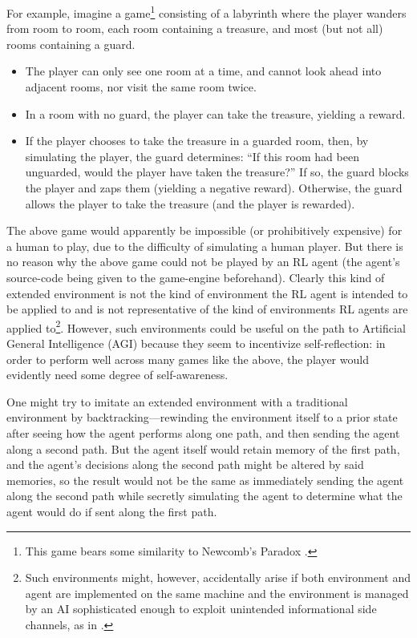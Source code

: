 \documentclass[runningheads]{llncs}
\begin{document}
For example, imagine a game\footnote{This game bears some similarity to Newcomb's
Paradox \cite{nozick1969newcomb}.} consisting of a
labyrinth where the player wanders from
room to room, each room containing a treasure, and most (but not all) rooms containing
a guard.
\begin{itemize}
    \item
    The player can only see one room at a time, and cannot look ahead into adjacent
    rooms, nor visit the same room twice.
    \item
    In a room with no guard, the player can take the treasure, yielding a reward.
    \item
    If the player chooses to take the treasure in a guarded room,
    then, by simulating the player, the guard determines: ``If
    this room had been unguarded, would the player have taken the treasure?''
    If so, the guard blocks the player and zaps them (yielding a negative reward).
    Otherwise, the guard allows the player to take the treasure (and the player is rewarded).
\end{itemize}

The above game would apparently be impossible (or prohibitively expensive)
for a human to play, due to the difficulty of simulating a human player.
But there is no reason why the above game could not be played by an RL agent (the
agent's source-code being given to the game-engine beforehand). Clearly this kind of
extended environment is not the kind of environment the RL agent is intended to be
applied to and is not representative of the kind of environments RL agents are
applied to\footnote{Such environments might, however, accidentally arise if both environment
and agent are implemented on the same machine and the environment is managed by an AI
sophisticated enough to exploit unintended informational side channels, as in
\cite{yampolskiy2012leakproofing}.}. However, such environments could be
useful on the path to Artificial
General Intelligence (AGI) because they seem to incentivize self-reflection: in order
to perform well across many games like the above, the player would evidently need
some degree of self-awareness.

One might try to imitate an extended environment with a traditional environment by
backtracking---rewinding the environment itself to a prior state after seeing how the
agent performs along one path, and then sending the agent along a second path.
But the agent itself would retain memory of the first path, and the agent's decisions
along the second path might be altered by said memories, so the result would not be
the same as immediately sending the agent along the second path while secretly simulating
the agent to determine what the agent would do if sent along the first path.
\end{document}
